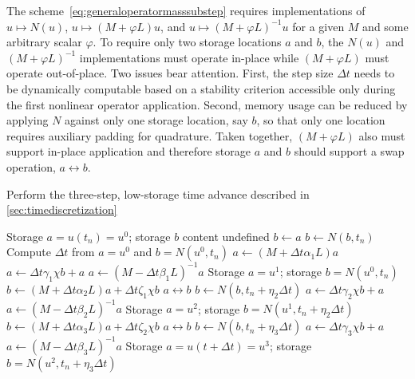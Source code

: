 The scheme~\eqref{eq:generaloperatormasssubstep} requires implementations
of $u\mapsto{}{N}\left(u\right)$, $u\mapsto{}\left(M+\varphi{}L\right)u$, and
$u\mapsto{}\left(M+\varphi{}L\right)^{-1}u$ for a given $M$ and some arbitrary
scalar $\varphi$.  To require only two storage locations $a$ and $b$, the
$N\left(u\right)$ and $\left(M+\varphi{}L\right)^{-1}$ implementations must
operate in-place while $\left(M+\varphi{}L\right)$ must operate out-of-place.
Two issues bear attention.  First, the step size $\Delta{}t$ needs to be
dynamically computable based on a stability criterion accessible only during
the first nonlinear operator application.  Second, memory usage can be reduced
by applying $N$ against only one storage location, say $b$, so that only one
location requires auxiliary padding for quadrature.  Taken together,
$\left(M+\varphi{}L\right)$ also must support in-place application and
therefore storage
$a$ and $b$ should support a swap operation, $a\leftrightarrow{}b$.

\begin{algorithm}
\caption{Perform the three-step, low-storage time advance
         described in \textsection\ref{sec:timediscretization}}
\label{alg:step}
\begin{algorithmic}
  \renewcommand{\algorithmiccomment}[1]{\hfill{}// #1}
  \REQUIRE Storage $a = u\left(t_{n}\right) = u^{0} $;
           storage $b$ content undefined
  \STATE $b\leftarrow{}a$
  \STATE $b\leftarrow{}N\left(b,t_{n}\right)$
  \STATE Compute $\Delta{}t$ from $a=u^0$ and $b=N\left(u^0,t_{n}\right)$
  \STATE $a\leftarrow{}\left(M+\Delta{}t\alpha_{1}L\right)a$
  \STATE $a\leftarrow{}\Delta{}t \gamma_{1} \chi{} b + a$
  \STATE $a\leftarrow{}\left(M-\Delta{}t\beta_{1}L\right)^{-1}a$
  \ENSURE Storage $a = u^1$;
          storage $b = N\left(u^{0},t_{n}\right)$
  \STATE $b\leftarrow{}   \left(M+\Delta{}t\alpha_{2}L\right)a
                        + \Delta{}t\zeta_{1}\chi{}b$
  \STATE $a\leftrightarrow{}b$
  \STATE $b\leftarrow{}N\left(b,t_{n}+\eta_{2}\Delta{}t\right)$
  \STATE $a\leftarrow{}\Delta{}t \gamma_{2} \chi{} b + a$
  \STATE $a\leftarrow{}\left(M-\Delta{}t\beta_{2}L\right)^{-1}a$
  \ENSURE Storage $a = u^{2}$;
          storage $b = N\left(u^{1},t_{n}+\eta_{2}\Delta{}t\right)$
  \STATE $b\leftarrow{}   \left(M+\Delta{}t\alpha_{3}L\right)a
                        + \Delta{}t\zeta_{2}\chi{}b$
  \STATE $a\leftrightarrow{}b$
  \STATE $b\leftarrow{}N\left(b,t_{n}+\eta_{3}\Delta{}t\right)$
  \STATE $a\leftarrow{}\Delta{}t \gamma_{3} \chi{}b + a$
  \STATE $a\leftarrow{}\left(M-\Delta{}t\beta_{3}L\right)^{-1}a$
  \ENSURE Storage $a = u\left(t+\Delta{}t\right)= u^{3}$;
          storage $b = N\left(u^{2},t_{n}+\eta_{3}\Delta{}t\right)$
\end{algorithmic}
\end{algorithm}

